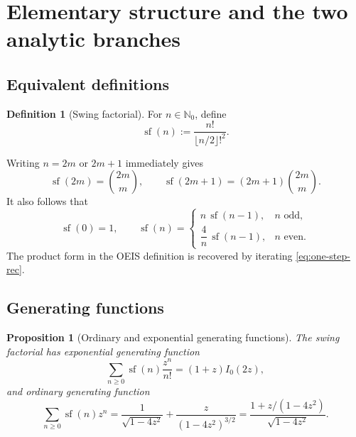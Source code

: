 \documentclass[11pt,a4paper]{article}
\numberwithin{equation}{section}
\newtheorem{proposition}[theorem]{Proposition}
\theoremstyle{definition}
\newtheorem{definition}[theorem]{Definition}
\theoremstyle{remark}
\newcommand{\SF}{\operatorname{sf}}
\begin{document}
\section{Elementary structure and the two analytic branches}

\subsection{Equivalent definitions}

\begin{definition}[Swing factorial]
For \(n\in\mathbb N_0\), define
\begin{equation}\label{eq:swing-def}
 \SF(n):=\frac{n!}{\lfloor n/2\rfloor!^2}.
\end{equation}
\end{definition}

Writing \(n=2m\) or \(2m+1\) immediately gives
\begin{equation}\label{eq:evenodd-basic}
 \SF(2m)=\binom{2m}{m},\qquad
 \SF(2m+1)=(2m+1)\binom{2m}{m}.
\end{equation}
It also follows that
\begin{equation}\label{eq:one-step-rec}
 \SF(0)=1,\qquad
 \SF(n)=
 \begin{cases}
   n\,\SF(n-1),&n\text{ odd},\\[1mm]
   \dfrac4n\,\SF(n-1),&n\text{ even}.
 \end{cases}
\end{equation}
The product form in the OEIS definition is recovered by iterating
\cref{eq:one-step-rec}.

\subsection{Generating functions}

\begin{proposition}[Ordinary and exponential generating functions]
The swing factorial has exponential generating function
\begin{equation}\label{eq:egf}
 \sum_{n\ge0}\SF(n)\frac{z^n}{n!}=(1+z)I_0(2z),
\end{equation}
and ordinary generating function
\begin{equation}\label{eq:ogf}
 \sum_{n\ge0}\SF(n)z^n
 =\frac1{\sqrt{1-4z^2}}+\frac{z}{(1-4z^2)^{3/2}}
 =\frac{1+z/(1-4z^2)}{\sqrt{1-4z^2}}.
\end{equation}
\end{proposition}
\end{document}
